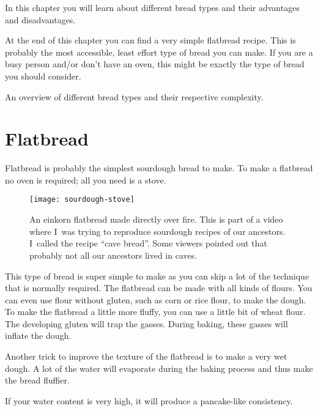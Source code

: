 In this chapter you will learn about different bread types
and their advantages and disadvantages.

At the end of this chapter
you can find a very simple flatbread recipe. This is probably
the most accessible, least effort type of bread you can make.
If you are a busy person and/or don't have an oven, this might
be exactly the type of bread you should consider.

\begin{table}[!htb]
    \begin{center}
        
        \caption[Different bread types]{An overview of different bread types
            and their respective complexity.}%
        \label{tab:bread-types-comparison}
    \end{center}
\end{table}

\section{Flatbread}

Flatbread is probably the simplest sourdough bread to make.
To make a flatbread no oven is required; all you need is a stove.

\begin{figure}[!htb]
  \texttt{[image: sourdough-stove]}
  \caption{An einkorn flatbread made directly over fire. This
  is part of a video where I~was trying to reproduce sourdough
  recipes of our ancestors. I~called the recipe ``cave bread''. Some viewers
  pointed out that probably not all our ancestors lived in caves.}
\end{figure}

This type of bread is super simple to make as you can skip
a lot of the technique that is normally required. The flatbread
can be made with all kinds of flours. You can even use
flour without gluten, such as corn or rice flour, to make the
dough. To make the flatbread a little more fluffy, you
can use a little bit of wheat flour. The developing gluten
will trap the gasses. During baking, these gasses will
inflate the dough.

Another trick to improve the texture of the flatbread is to
make a very wet dough. A lot of the water will evaporate
during the baking process and thus make the bread fluffier.

If your water content is very high, it will produce a
pancake-like consistency.

